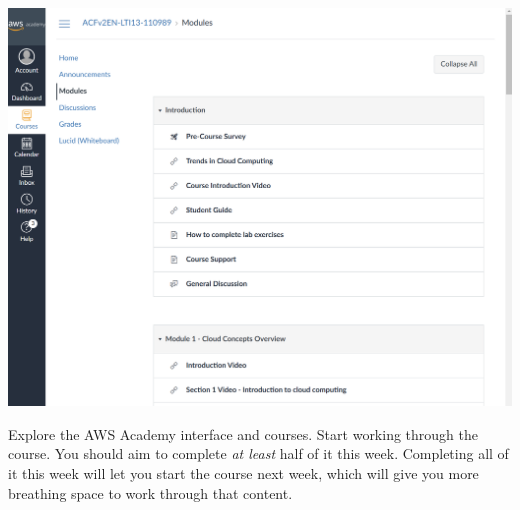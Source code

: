 \vspace{4mm}
\noindent
\includegraphics[width=\textwidth]{images/modules}
\vspace{2mm}

\noindent
Explore the AWS Academy interface and courses.
Start working through the  course.
You should aim to complete \textit{at least} half of it this week.
Completing all of it this week will let you start the 
 course next week, 
which will give you more breathing space to work through that content.
